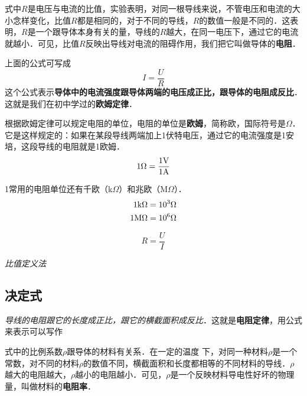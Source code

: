 \documentclass[10pt,cn]{elegantbook}
\begin{document}
      式中$R$是电压与电流的比值，实验表明，对同一根导线来说，不管电压和电流的大小念样变化，比值$R$都是相同的，对于不同的导线，$R$的数值一般是不同的．这表明，$R$是一个跟导体本身有关的量，导线的$R$越大，在同一电压下，通过它的电流就越小．可见，比值$R$反映出导线对电流的阻碍作用，我们把它叫做导体的\textbf{电阻}．
      
      上面的公式可写成
      \[I=\frac{U}{R}\]
      这个公式表示\textbf{导体中的电流强度跟导体两端的电压成正比，跟导体的电阻成反比}．这就是我们在初中学过的\textbf{欧姆定律}．
      
      根据欧姆定律可以规定电阻的单位，电阻的单位是\textbf{欧姆}，简称欧，国际符号是$\Omega$． 它是这样规定的：如果在某段导线两端加上1伏特电压，通过它的电流强度是1安培，这段导线的电阻就是1欧姆．
      \[1\Omega=\frac{1{\rm V}}{1{\rm A}} \]
      
      1常用的电阻单位还有千欧（k$\Omega$）和兆欧（M$\Omega$）．
      \[\begin{split}
      	1{\rm k}\Omega&= 10^{3}\Omega\\
      	1{\rm M}\Omega&=10^{6}\Omega
      \end{split}\]
      
      
      
      $$R=\dfrac{U}{I}$$
      
      \textit{比值定义法}
      
      \subsection{决定式}
      
      \textit{导线的电阻跟它的长度成正比，跟它的横截面积成反比}．这就是\textbf{电阻定律}，用公式来表示可以写作
      \begin{center}
      \end{center}
    
     
      式中的比例系数$\rho$跟导体的材料有关系．在一定的温度
      下，对同一种材料$\rho$是一个常数，对不同的材料$\rho$的数值不同，横截面积和长度都相等的不同材料的导线．$\rho$越大的电阻越大，$\rho$越小的电阻越小．可见，$\rho$是一个反映材料导电性好坏的物理量，叫做材料的\textbf{电阻率}．
      
\end{document}
